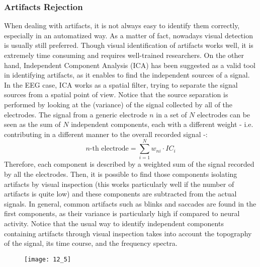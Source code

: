 \subsubsection{Artifacts Rejection}
When dealing with artifacts, it is not always easy to identify them correctly, especially in
an automatized way. As a matter of fact, nowadays visual detection is usually still preferred.
Though visual identification of artifacts works well, it is extremely time consuming and
requires well-trained researchers. On the other hand, Independent Component Analysis (ICA) has
been suggested as a valid tool in identifying artifacts, as it enables to find the
independent sources of a signal. In the EEG case, ICA works as a spatial filter, trying to
separate the signal sources from a spatial point of view. Notice that the source separation
is performed by looking at the (variance) of the signal collected by all of the electrodes.
The signal from a generic electrode \(n\) in a set of \(N\) electrodes can be seen as the
sum of \(N\) independent components, each with a different weight - i.e. contributing in a
different manner to the overall recorded signal -:
\begin{equation*}
    n\text{-th electrode} = \sum_{i=1}^N w_{ni}\cdot{IC_i}
\end{equation*}
Therefore, each component is described by a weighted sum of the signal recorded by all the
electrodes. Then, it is possible to find those components isolating artifacts by visual
inspection (this works particularly well if the number of artifacts is quite low) and these
components are subtracted from the actual signals. In general, common artifacts such as blinks
and saccades are found in the first components, as their variance is particularly high if
compared to neural activity. Notice that the usual way to identify independent components
containing artifacts through visual inspection takes into account the topography of the signal,
its time course, and the frequency spectra.
\begin{figure}[H]
    \centering
    \texttt{[image: 12\_5]}
\end{figure}
